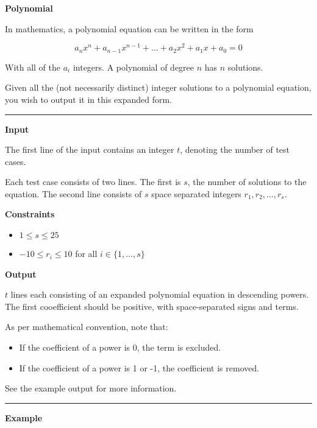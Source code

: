 \LARGE \textbf{Polynomial} \normalsize

In mathematics, a polynomial equation can be written in the form

\begin{equation*}
    a_n x^n + a_{n-1} x^{n-1} + \dots + a_2 x^2 + a_1 x + a_0 = 0
\end{equation*}

With all of the $a_i$ integers. A polynomial of degree $n$ has $n$ solutions.

Given all the (not necessarily distinct) integer solutions to a polynomial equation, you wish to output it in this expanded form.

\vspace{8pt}
\hrule

\textbf{Input}

The first line of the input contains an integer $t$, denoting the number of test cases.

Each test case consists of two lines. The first is $s$, the number of solutions to the equation. 
The second line consists of $s$ space separated integers $r_1, r_2, \dots, r_s$.

\textbf{Constraints}

\begin{itemize}
    \item $1 \leq s \leq 25$
    \item $-10 \leq r_i \leq 10$ for all $i \in \{ 1, \dots, s\}$
\end{itemize}

\textbf{Output}

$t$ lines each consisting of an expanded polynomial equation in descending powers. 
The first cooefficient should be positive, with space-separated signs and terms.

As per mathematical convention, note that:

\begin{itemize}
    \item If the coefficient of a power is 0, the term is excluded.
    \item If the coefficient of a power is 1 or -1, the coefficient is removed.
\end{itemize}

See the example output for more information.

\vspace{8pt}
\hrule

\textbf{Example}

